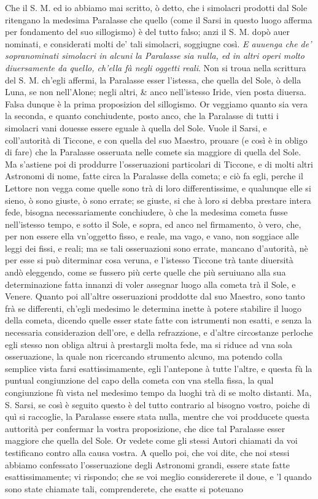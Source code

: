 \documentclass[11pt,twoside,openany]{book}
\begin{document}
Che il S. M. ed io abbiamo mai scritto, ò detto, che i simolacri prodotti dal Sole ritengano la medesima Paralasse che quello (come il Sarsi in questo luogo afferma per fondamento del suo sillogismo) è del tutto falso; anzi il S. M. dopò auer nominati, e considerati molti de' tali simolacri, soggiugne così. \textit{E auuenga che de' sopranominati simolacri in alcuni la Paralasse sia nulla, ed in altri operi molto diuersamente da quello, ch'ella fà negli oggetti reali}. Non si troua nella scrittura del S. M. ch'egli affermi, la Paralasse esser l'istessa, che quella del Sole, ò della Luna, se non nell'Alone; negli altri, \& anco nell'istesso Iride, vien posta diuersa. Falsa dunque è la prima proposizion del sillogismo. Or veggiamo quanto sia vera la seconda, e quanto conchiudente, posto anco, che la Paralasse di tutti i simolacri vani douesse essere eguale à quella del Sole. Vuole il Sarsi, e coll'autorità di Ticcone, e con quella del suo Maestro, prouare (e così è in obligo di fare) che la Paralasse osseruata nelle comete sia maggiore di quella del Sole. Ma s'astiene poi di proddurre l'osseruazioni particolari di Ticcone, e di molti altri Astronomi di nome, fatte circa la Paralasse della cometa; e ciò fa egli, perche il Lettore non vegga come quelle sono trà di loro differentissime, e qualunque elle si sieno, ò sono giuste, ò sono errate; se giuste, si che à loro si debba prestare intera fede, bisogna necessariamente conchiudere, ò che la medesima cometa fusse nell'istesso tempo, e sotto il Sole, e sopra, ed anco nel firmamento, ò vero, che, per non essere ella vn'oggetto fisso, e reale, ma vago, e vano, non soggiace alle leggi dei fissi, e reali; ma se tali osseruazioni sono errate, mancano d'autorità, nè per esse si può diterminar cosa veruna, e l'istesso Ticcone trà tante diuersità andò eleggendo, come se fussero più certe quelle che più seruiuano alla sua determinazione fatta innanzi di voler assegnar luogo alla cometa trà il Sole, e Venere. Quanto poi all'altre osseruazioni proddotte dal suo Maestro, sono tanto frà se differenti, ch'egli medesimo le determina inette à potere stabilire il luogo della cometa, dicendo quelle esser state fatte con istrumenti non esatti, e senza la necessaria considerazion dell'ore, e della refrazzione, e d'altre circostanze perloche egli stesso non obliga altrui à prestargli molta fede, ma si riduce ad vna sola osseruazione, la quale non ricercando strumento alcuno, ma potendo colla semplice vista farsi esattissimamente, egli l'antepone à tutte l'altre, e questa fù la puntual congiunzione del capo della cometa con vna stella fissa, la qual congiunzione fù vista nel medesimo tempo da luoghi trà di se molto distanti. Ma, S. Sarsi, se così è seguito questo è del tutto contrario al bisogno vostro, poiche di quì si raccoglie, la Paralasse essere stata nulla, mentre che voi prodducete questa auttorità per confermar la vostra proposizione, che dice tal Paralasse esser maggiore che quella del Sole. Or vedete come gli stessi Autori chiamati da voi testificano contro alla causa vostra. A quello poi, che voi dite, che noi stessi abbiamo confessato l'osseruazione degli Astronomi grandi, essere state fatte esattissimamente; vi rispondo; che se voi meglio considererete il doue, e 'l quando sono state chiamate tali, comprenderete, che esatte si poteuano 
\end{document}
